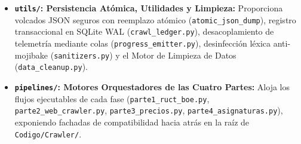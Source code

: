 \begin{itemize}
    \item \textbf{\texttt{utils/}: Persistencia Atómica, Utilidades y Limpieza:} Proporciona volcados JSON seguros con reemplazo atómico (\texttt{atomic\_json\_dump}), registro transaccional en SQLite WAL (\texttt{crawl\_ledger.py}), desacoplamiento de telemetría mediante colas (\texttt{progress\_emitter.py}), desinfección léxica anti-mojibake (\texttt{sanitizers.py}) y el Motor de Limpieza de Datos (\texttt{data\_cleanup.py}).
    \item \textbf{\texttt{pipelines/}: Motores Orquestadores de las Cuatro Partes:} Aloja los flujos ejecutables de cada fase (\texttt{parte1\_ruct\_boe.py}, \texttt{parte2\_web\_crawler.py}, \texttt{parte3\_precios.py}, \texttt{parte4\_asignaturas.py}), exponiendo fachadas de compatibilidad hacia atrás en la raíz de \texttt{Codigo/Crawler/}.
\end{itemize}

